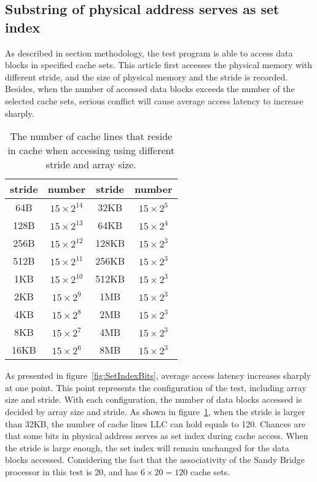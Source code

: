 \documentclass[conference]{IEEEtran}
\newcommand{\SandyBridge}{Sandy Bridge }
\newcommand{\otoprule}{\midrule[\heavyrulewidth]}
\begin{document}
\subsection{Substring of physical address serves as set index}
As described in section methodology, the test program is able to access data blocks in specified cache sets. This article first accesses the physical memory with different stride, and the size of physical memory and the stride is recorded. Besides, when the number of accessed data blocks exceeds the number of the selected cache sets, serious conflict will cause average access latency to increase sharply.
\begin{table}[!htbp]
	\centering
	\caption{The number of cache lines that reside in cache when accessing using different stride and array size.}
	\begin{tabular}{cccc}
		\toprule
		stride  &number    & stride & number \\ \otoprule
		64B      & $15 \times 2^{14}$  &   32KB      &   $15 \times 2^{5}$     \\ \midrule
		128B     & $15 \times 2^{13}$  &   64KB      &   $15 \times 2^{4}$     \\ \midrule
		256B     & $15 \times 2^{12}$  &  128KB      &   $15 \times 2^{3}$     \\ \midrule
		512B     & $15 \times 2^{11}$  &  256KB      &   $15 \times 2^{3}$     \\ \midrule
		 1KB     & $15 \times 2^{10}$  &  512KB      &   $15 \times 2^{3}$     \\ \midrule
		 2KB     & $15 \times 2^{9}$   &    1MB      &   $15 \times 2^{3}$     \\ \midrule
		 4KB     & $15 \times 2^{8}$   &    2MB      &   $15 \times 2^{3}$     \\ \midrule
		 8KB     & $15 \times 2^{7}$   &    4MB      &   $15 \times 2^{3}$     \\ \midrule
		16KB     & $15 \times 2^{6}$   &    8MB      &   $15 \times 2^{3}$     \\ \bottomrule
		\end{tabular}
		\label{tab:SetIndexBitsSingularity}
\end{table}

As presented in figure~\ref{fig:SetIndexBits}, average access latency increases sharply at one point. This point represents the configuration of the test, including array size and stride. With each configuration, the number of data blocks accessed is decided by array size and stride. As shown in figure~\ref{tab:SetIndexBitsSingularity}, when the stride is larger than 32KB, the number of cache lines LLC can hold equals to 120. Chances are that some bits in physical address serves as set index during cache access. When the stride is large enough, the set index will remain unchanged for the data blocks accessed. Considering the fact that the associativity of the \SandyBridge processor in this test is 20, and has $6 \times 20 = 120$ cache sets. 
\end{document}
